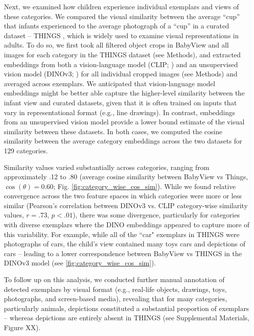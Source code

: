Next, we examined how children experience individual exemplars and views of these categories.
We compared the visual similarity between the average ``cup'' that infants experienced to the average photograph of a ``cup'' in a curated dataset -- THINGS \citep{stoinski2024thingsplus}, which is widely used to examine visual representations in adults. To do so, we first took all filtered object crops in BabyView and all images for each category in the THINGS dataset (see Methods), and extracted embeddings from both a vision-language model (CLIP; \citet{radford2021learning}) and an unsupervised vision model (DINOv3; \citet{simeoni2025dinov3}) for all individual cropped images (see Methods) and averaged across exemplars. We anticipated that vision-language model embeddings might be better able capture the higher-level similarity between the infant view and curated datasets, given that it is often trained on inputs that vary in representational format (e.g., line drawings). In contrast, embeddings from an unsupervised vision model provide a lower bound estimate of the visual similarity between these datasets. In both cases, we computed the cosine similarity between the average category embeddings across the two datasets for 129 categories. 

Similarity values varied substantially across categories, ranging from approximately .12 to .80 (average cosine similarity between BabyView vs Things, $\cos(\theta)=0.60$; Fig. \ref{fig:category_wise_cos_sim}). While we found relative convergence across the two feature spaces in which categories were more or less similar (Pearson's correlation between DINOv3 vs. CLIP category-wise similarity values, $r = .73$, $p < .01$), there was some divergence, particularly for categories with diverse exemplars where the DINO embeddings appeared to  capture more of this variability. For example, while all of the ``car" exemplars in THINGS were photographs of cars, the child's view contained many toys cars and depictions of cars -- leading to a lower correspondence between BabyView vs THINGS in the DINOv3 model (see \ref{fig:category_wise_cos_sim}). 

To follow up on this analysis, we conducted further manual annotation of detected exemplars by visual format (e.g., real-life objects, drawings, toys, photographs, and screen-based media), revealing that for many categories, particularly animals, depictions constituted a substantial proportion of exemplars -- whereas  depictions are entirely absent in THINGS (see Supplemental Materials, Figure XX).

